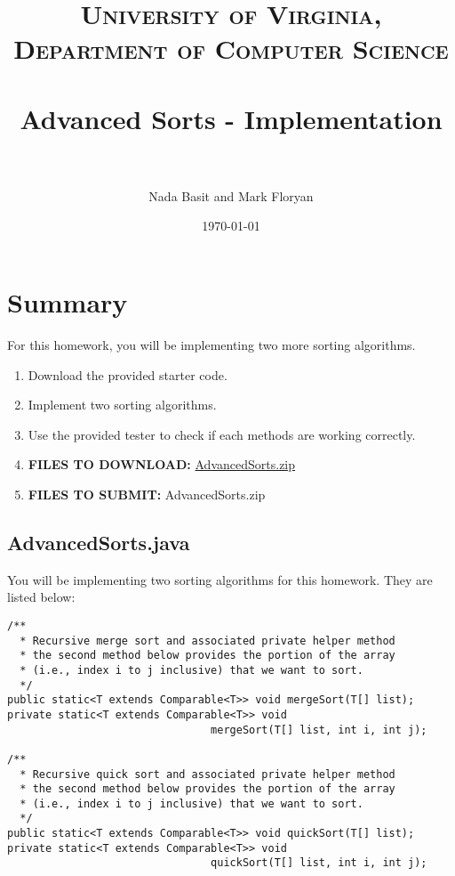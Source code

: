 \documentclass[paper=a4, fontsize=11pt, parskip=full]{scrartcl} %
\title{
\normalfont \normalsize
\textsc{University of Virginia, Department of Computer Science} \\ [25pt] %
\horrule{0.5pt} \\[0.4cm] %
\huge Advanced Sorts - Implementation \\ %
\horrule{2pt} \\[0.5cm] %
}
\author{Nada Basit and Mark Floryan}
\date{\normalsize\today} %
\numberwithin{equation}{section} %
\numberwithin{figure}{section} %
\numberwithin{table}{section} %
\begin{document}
\maketitle %


\section{Summary}

For this homework, you will be implementing two more sorting algorithms.

\begin{enumerate}
	\item Download the provided starter code.
	\item Implement two sorting algorithms.
	\item Use the provided tester to check if each methods are working correctly.
	\item \textbf{FILES TO DOWNLOAD:} \href{https://github.com/uva-cs/dsa1/blob/master/homeworks/AdvancedSorts/code/AdvancedSorts.zip?raw=true}{AdvancedSorts.zip}
	\item \textbf{FILES TO SUBMIT:} AdvancedSorts.zip
\end{enumerate}


\subsection{AdvancedSorts.java}

You will be implementing two sorting algorithms for this homework. They are listed below:

\begin{lstlisting}
/**
  * Recursive merge sort and associated private helper method
  * the second method below provides the portion of the array
  * (i.e., index i to j inclusive) that we want to sort.
  */
public static<T extends Comparable<T>> void mergeSort(T[] list);
private static<T extends Comparable<T>> void
								mergeSort(T[] list, int i, int j);

/**
  * Recursive quick sort and associated private helper method
  * the second method below provides the portion of the array
  * (i.e., index i to j inclusive) that we want to sort.
  */
public static<T extends Comparable<T>> void quickSort(T[] list);
private static<T extends Comparable<T>> void
								quickSort(T[] list, int i, int j);
\end{lstlisting}
\end{document}
